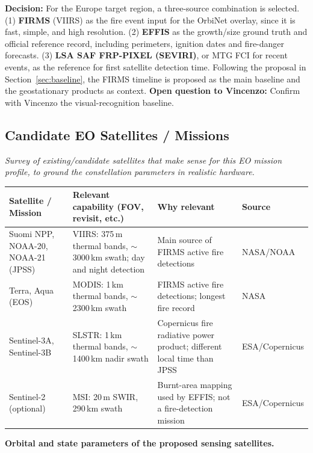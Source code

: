 \documentclass[11pt]{article}
\newcommand{\vincenzoq}[1]{\textcolor{vincenzoq}{\textbf{Open question to Vincenzo:}} #1}
\begin{document}
\noindent\textbf{Decision:} For the Europe target region, a three-source combination is selected.
(1) \textbf{FIRMS} (VIIRS) as the fire event input for the OrbiNet overlay, since it is fast, simple, and high resolution.
(2) \textbf{EFFIS} as the growth/size ground truth and official reference record, including perimeters, ignition dates and fire-danger forecasts.
(3) \textbf{LSA SAF FRP-PIXEL (SEVIRI)}, or MTG FCI for recent events, as the reference for first satellite detection time. Following the proposal in Section~\ref{sec:baseline}, the FIRMS timeline is proposed as the main baseline and the geostationary products as context.
\vincenzoq{Confirm with Vincenzo the visual-recognition baseline.}

\subsection{Candidate EO Satellites / Missions}\label{subsec:candidate}
\textit{Survey of existing/candidate satellites that make sense for this EO mission profile, to ground the constellation parameters in realistic hardware.}

\begin{longtable}{p{3cm}p{4cm}p{3.8cm}p{3cm}}
\toprule
\textbf{Satellite / Mission} & \textbf{Relevant capability (FOV, revisit, etc.)} & \textbf{Why relevant} & \textbf{Source} \\
\midrule
\endhead
Suomi NPP, NOAA-20, NOAA-21 (JPSS) & VIIRS: 375\,m thermal bands, $\sim$3000\,km swath; day and night detection & Main source of FIRMS active fire detections & NASA/NOAA \\
Terra, Aqua (EOS) & MODIS: 1\,km thermal bands, $\sim$2300\,km swath & FIRMS active fire detections; longest fire record & NASA \\
Sentinel-3A, Sentinel-3B & SLSTR: 1\,km thermal bands, $\sim$1400\,km nadir swath & Copernicus fire radiative power product; different local time than JPSS & ESA/Copernicus \\
Sentinel-2 (optional) & MSI: 20\,m SWIR, 290\,km swath & Burnt-area mapping used by EFFIS; not a fire-detection mission & ESA/Copernicus \\
\bottomrule
\end{longtable}

\textbf{Orbital and state parameters of the proposed sensing satellites.}
\end{document}
